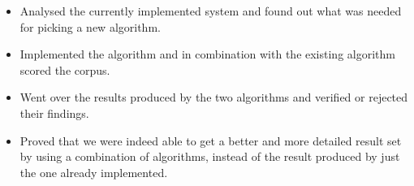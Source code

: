 \begin{itemize}
	\item Analysed the currently implemented system and found out what was needed for picking a new algorithm.
	\item Implemented the algorithm and in combination with the existing algorithm scored the corpus.
	\item Went over the results produced by the two algorithms and verified or rejected their findings.
	\item Proved that we were indeed able to get a better and more detailed result set by using a combination of algorithms, instead of the result produced by just the one already implemented.
\end{itemize}